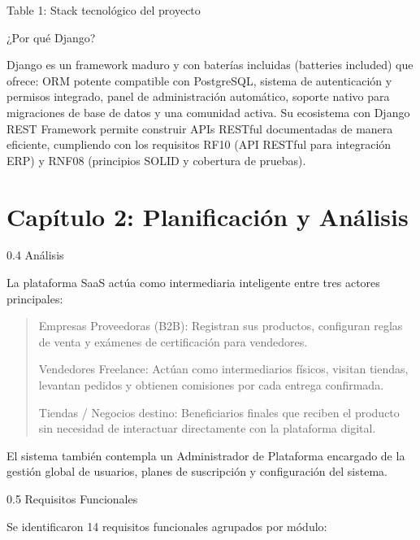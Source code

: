 \documentclass[
]{article}
\begin{document}
Table 1: Stack tecnológico del proyecto

¿Por qué Django?

Django es un framework maduro y con baterías incluidas (batteries
included) que ofrece: ORM potente compatible con PostgreSQL, sistema de
autenticación y permisos integrado, panel de administración automático,
soporte nativo para migraciones de base de datos y una comunidad activa.
Su ecosistema con Django REST Framework permite construir APIs RESTful
documentadas de manera eficiente, cumpliendo con los requisitos RF10
(API RESTful para integración ERP) y RNF08 (principios SOLID y cobertura
de pruebas).

\section{Capítulo 2: Planificación y
Análisis}\label{capuxedtulo-2-planificaciuxf3n-y-anuxe1lisis}

0.4 Análisis

La plataforma SaaS actúa como intermediaria inteligente entre tres
actores principales:

\begin{quote}
Empresas Proveedoras (B2B): Registran sus productos, configuran reglas
de venta y exámenes de certificación para vendedores.

Vendedores Freelance: Actúan como intermediarios físicos, visitan
tiendas, levantan pedidos y obtienen comisiones por cada entrega
confirmada.

Tiendas / Negocios destino: Beneficiarios finales que reciben el
producto sin necesidad de interactuar directamente con la plataforma
digital.
\end{quote}

El sistema también contempla un Administrador de Plataforma encargado de
la gestión global de usuarios, planes de suscripción y configuración del
sistema.

0.5 Requisitos Funcionales

Se identificaron 14 requisitos funcionales agrupados por módulo:
\end{document}
